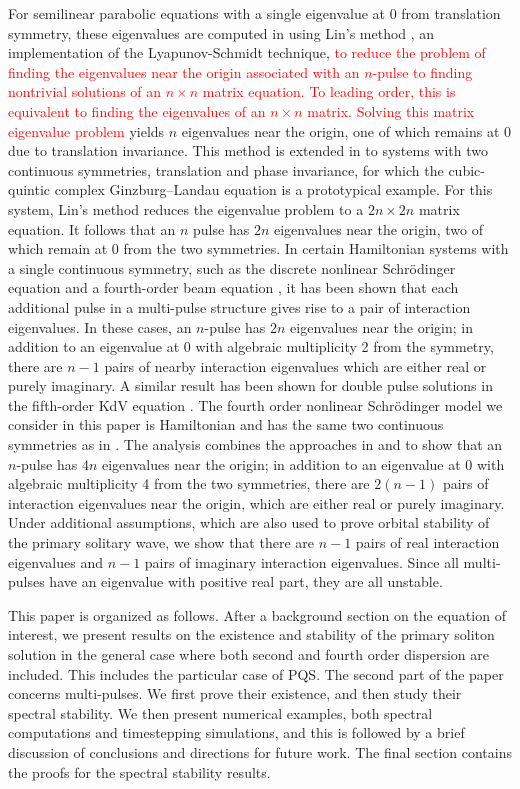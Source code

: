 \documentclass[12pt]{elsarticle}
\newcommand{\revised}[1]{ \textcolor{red}{#1} }
\begin{document}
For semilinear parabolic equations with a single eigenvalue at 0 from translation symmetry, these eigenvalues are computed in \cite{Sandstede1998} using Lin's method \cite{Lin1990}, an implementation of the Lyapunov-Schmidt technique, \revised{to reduce the problem of finding the eigenvalues near the origin associated with an $n$-pulse to finding nontrivial solutions of an $n\times n$ matrix equation. To leading order, this is equivalent to finding the eigenvalues of an $n \times n$ matrix. Solving this matrix eigenvalue problem} yields $n$ eigenvalues near the origin, one of which remains at 0 due to translation invariance. This method is extended in \cite{Manukian} to systems with two continuous symmetries, translation and phase invariance, for which the cubic-quintic complex Ginzburg–Landau equation is a prototypical example. For this system, Lin's method reduces the eigenvalue problem to a $2n\times 2n$ matrix equation. It follows that an $n$ pulse has $2n$ eigenvalues near the origin, two of which remain at 0 from the two symmetries. In certain Hamiltonian systems with a single continuous symmetry, such as the discrete nonlinear Schr{\"o}dinger equation \cite{Parker2020} and a fourth-order beam equation \cite{Kapitula2020}, it has been shown that each additional pulse in a multi-pulse structure gives rise to a pair of interaction eigenvalues. In these cases, an $n$-pulse has $2n$ eigenvalues near the origin; in addition to an eigenvalue at 0 with algebraic multiplicity 2 from the symmetry, there are $n-1$ pairs of nearby interaction eigenvalues which are either real or purely imaginary. A similar result has been shown for double pulse solutions in the fifth-order KdV equation \cite{Pelinovsky2007}. The fourth order nonlinear Schr{\"o}dinger model we consider in this paper is Hamiltonian and has the same two continuous symmetries as in \cite{Manukian}. The analysis combines the approaches in \cite{Manukian} and \cite{Parker2020} to show that an $n$-pulse has $4n$ eigenvalues near the origin; in addition to an eigenvalue at 0 with algebraic multiplicity 4 from the two symmetries, there are $2(n-1)$ pairs of interaction eigenvalues near the origin, which are either real or purely imaginary. Under additional assumptions, which are also used to prove orbital stability of the primary solitary wave, we show that there are $n-1$ pairs of real interaction eigenvalues and $n-1$ pairs of imaginary interaction eigenvalues. Since all multi-pulses have an eigenvalue with positive real part, they are all unstable.

This paper is organized as follows. After a background section on the equation of interest, we present results on the existence and stability of the primary soliton solution in the general case where both second and fourth order dispersion are included. This includes the particular case of PQS. The second part of the paper concerns multi-pulses. We first prove their existence, and then study their spectral stability. We then present numerical examples, both spectral computations and timestepping simulations, and this is followed by a brief discussion of conclusions and directions for future work. The final section contains the proofs for the spectral stability results.
\end{document}
